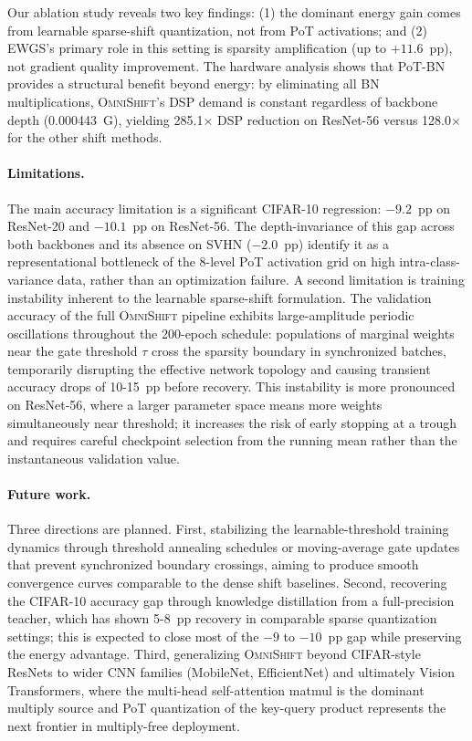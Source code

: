 \documentclass[12pt]{article}
\newcommand{\omnishift}{\textsc{OmniShift}}
\begin{document}
Our ablation study reveals two key findings: (1) the dominant energy gain comes from learnable sparse-shift quantization, not from PoT activations; and (2) EWGS's primary role in this setting is sparsity amplification (up to $+11.6$~pp), not gradient quality improvement. The hardware analysis shows that PoT-BN provides a structural benefit beyond energy: by eliminating all BN multiplications, \omnishift{}'s DSP demand is constant regardless of backbone depth (0.000443~G), yielding 285.1$\times$ DSP reduction on ResNet-56 versus 128.0$\times$ for the other shift methods.

\paragraph{Limitations.}
The main accuracy limitation is a significant CIFAR-10 regression: $-9.2$~pp on ResNet-20 and $-10.1$~pp on ResNet-56. The depth-invariance of this gap across both backbones and its absence on SVHN ($-2.0$~pp) identify it as a representational bottleneck of the 8-level PoT activation grid on high intra-class-variance data, rather than an optimization failure. A second limitation is training instability inherent to the learnable sparse-shift formulation. The validation accuracy of the full \omnishift{} pipeline exhibits large-amplitude periodic oscillations throughout the 200-epoch schedule: populations of marginal weights near the gate threshold $\tau$ cross the sparsity boundary in synchronized batches, temporarily disrupting the effective network topology and causing transient accuracy drops of 10-15~pp before recovery. This instability is more pronounced on ResNet-56, where a larger parameter space means more weights simultaneously near threshold; it increases the risk of early stopping at a trough and requires careful checkpoint selection from the running mean rather than the instantaneous validation value.

\paragraph{Future work.}
Three directions are planned. First, stabilizing the learnable-threshold training dynamics through threshold annealing schedules or moving-average gate updates that prevent synchronized boundary crossings, aiming to produce smooth convergence curves comparable to the dense shift baselines. Second, recovering the CIFAR-10 accuracy gap through knowledge distillation \cite{han2016deepcomp} from a full-precision teacher, which has shown 5-8~pp recovery in comparable sparse quantization settings; this is expected to close most of the $-9$ to $-10$~pp gap while preserving the energy advantage. Third, generalizing \omnishift{} beyond CIFAR-style ResNets to wider CNN families (MobileNet, EfficientNet) and ultimately Vision Transformers, where the multi-head self-attention matmul is the dominant multiply source and PoT quantization of the key-query product represents the next frontier in multiply-free deployment.
\end{document}
